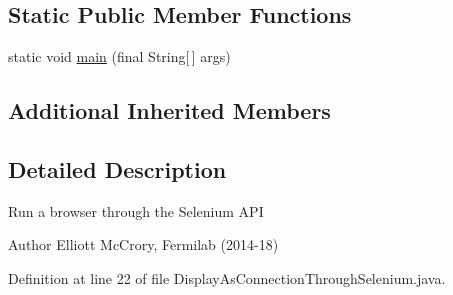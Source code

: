 \subsection*{Static Public Member Functions}
\begin{DoxyCompactItemize}
\item 
static void \hyperlink{classgov_1_1fnal_1_1ppd_1_1dd_1_1display_1_1client_1_1selenium_1_1DisplayAsConnectionThroughSelenium_a4521e424f08cb1e37b0f80fa23d75e54}{main} (final String\mbox{[}$\,$\mbox{]} args)
\end{DoxyCompactItemize}
\subsection*{Additional Inherited Members}


\subsection{Detailed Description}
Run a browser through the Selenium A\-P\-I

\begin{DoxyAuthor}{Author}
Elliott Mc\-Crory, Fermilab (2014-\/18) 
\end{DoxyAuthor}


Definition at line 22 of file Display\-As\-Connection\-Through\-Selenium.\-java.



